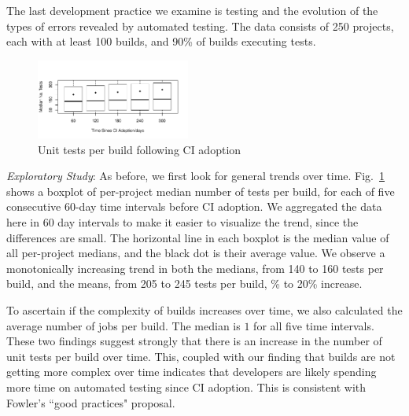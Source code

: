 The last development practice we examine is testing and the evolution 
of the types of errors revealed by automated testing.
The data consists of 250 projects, each with at least 100 builds, and 90\% 
of builds executing tests.

\begin{figure}[!t]
\centering
\includegraphics[width=0.45\textwidth, clip=true, trim=0 15 15 50]{tests.pdf}
\caption{Unit tests per build following CI adoption}
\label{Fig:Tests}
\end{figure}

\smallskip\noindent \emph{Exploratory Study}: 
As before, we first look for general trends over time.
Fig.~\ref{Fig:Tests} shows a boxplot of per-project median number of tests 
per build, for each of five consecutive 60-day time intervals before CI adoption.
We aggregated the data here in 60 day intervals to make it easier to visualize 
the trend, since the differences are small.
The horizontal line in each boxplot is the median value of all per-project medians, 
and the black dot is their average value.
We observe a monotonically increasing trend in both the medians, from 140 to 
160 tests per build, and the means, from 205 to 245 tests per build, \% to 
20\% increase. 

To ascertain if the complexity of builds increases over time, we also calculated 
the average number of jobs per build.
The median is $1$ for all five time intervals.
These two findings suggest strongly that there is an increase in the number of 
unit tests per build over time.
This, coupled with our finding that builds are not getting more complex over time indicates that developers are likely spending more time on 
automated testing since CI adoption.
This is consistent with Fowler's ``good practices" proposal.



